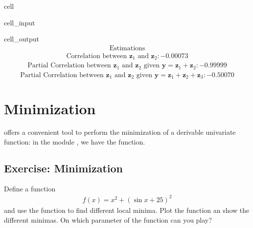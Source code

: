 \documentclass[letterpaper,10pt,english]{jupyterBook}
\begin{document}
\begin{sphinxuseclass}{cell}
\begin{sphinxVerbatimInput}
\begin{sphinxuseclass}{cell_input}
\end{sphinxuseclass}\end{sphinxVerbatimInput}
\begin{sphinxVerbatimOutput}

\begin{sphinxuseclass}{cell_output}\begin{equation*}
\begin{split}\displaystyle \text{Estimations}\end{split}
\end{equation*}\begin{equation*}
\begin{split}\displaystyle \text{Correlation between }\mathbf z_1\text{ and }\mathbf z_2: -0.00073\end{split}
\end{equation*}\begin{equation*}
\begin{split}\displaystyle \text{Partial Correlation between }\mathbf z_1\text{ and }\mathbf z_2\text{ given }\mathbf y=\mathbf z_1+\mathbf z_2:-0.99999\end{split}
\end{equation*}\begin{equation*}
\begin{split}\displaystyle \text{Partial Correlation between }\mathbf z_1\text{ and }\mathbf z_2\text{ given }\mathbf y=\mathbf z_1+\mathbf z_2+\mathbf z_3:-0.50070\end{split}
\end{equation*}
\end{sphinxuseclass}\end{sphinxVerbatimOutput}

\end{sphinxuseclass}

\section{Minimization}
\label{\detokenize{01:minimization}}
\sphinxAtStartPar
{} offers a convenient tool to perform the minimization of a derivable univariate function: in the module , we have the  function.


\subsection{Exercise: Minimization}
\label{\detokenize{01:exercise-minimization}}
\sphinxAtStartPar
Define a function
\begin{equation*}
\begin{split}f(x) = x^2 + (\sin{x} + 25)^2\end{split}
\end{equation*}
\sphinxAtStartPar
and use the  function to find different local minima. Plot the function an show the different minimas. On which parameter of the  function can you play?
\end{document}
